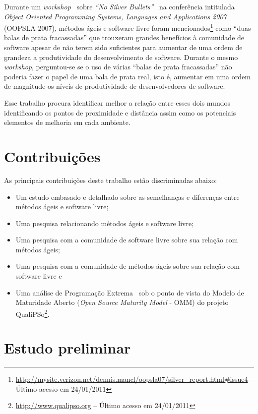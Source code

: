 Durante um \emph{workshop}~\cite{OOPSLA07} sobre \emph{``No Silver
  Bullets''}~\cite{Brooks1987} na conferência intitulada \emph{Object
  Oriented Programming Systems, Languages and Applications 2007}
(OOPSLA 2007), métodos ágeis e software livre foram
mencionados\footnote{\url{http://mysite.verizon.net/dennis.mancl/oopsla07/silver_report.html\#issue4}
  -- Último acesso em 24/01/2011} como ``duas balas de prata
fracassadas'' que trouxeram grandes benefícios à comunidade de
software apesar de não terem sido suficientes para aumentar de uma
ordem de grandeza a produtividade do desenvolvimento de
software. Durante o mesmo \emph{workshop}, perguntou-se se o uso de
várias ``balas de prata fracassadas'' não poderia fazer o papel de uma
bala de prata real, isto é, aumentar em uma ordem de magnitude os
níveis de produtividade de desenvolvedores de software.

Esse trabalho procura identificar melhor a relação entre esses dois
mundos identificando os pontos de proximidade e distância assim como
os potenciais elementos de melhoria em cada ambiente.


\section{Contribuições}
\label{sec:contribucoes}

As principais contribuições deste trabalho estão discriminadas abaixo:

\begin{itemize}
\item Um estudo embasado e detalhado sobre as semelhanças e diferenças
  entre métodos ágeis e software livre;
\item Uma pesquisa relacionando métodos ágeis e software livre;
\item Uma pesquisa com a comunidade de software livre sobre sua
  relação com métodos ágeis;
\item Uma pesquisa com a comunidade de métodos ágeis sobre sua relação
  com software livre e
\item Uma análise de Programação Extrema~\cite{XP01} sob o ponto de
  vista do Modelo de Maturidade Aberto (\emph{Open Source Maturity
    Model} - OMM) do projeto
  QualiPSo\footnote{\url{http://www.qualipso.org} -- Último acesso em
    24/01/2011}.
\end{itemize}

\section{Estudo preliminar}
\label{sec:estudo-preliminar}

